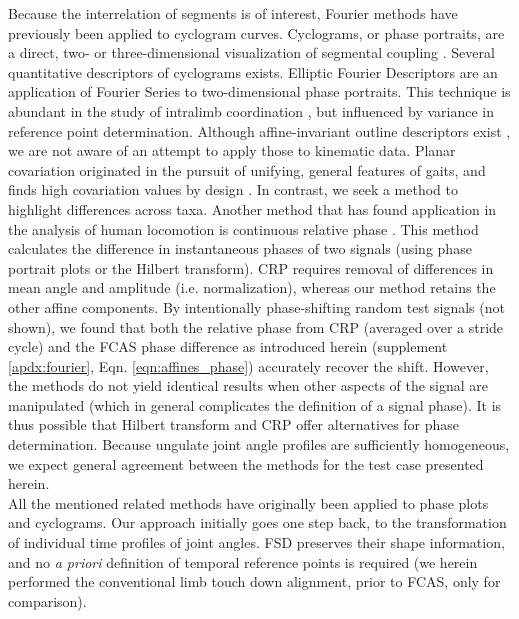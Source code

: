 Because the interrelation of segments is of interest, Fourier methods have previously been applied to cyclogram curves.
Cyclograms, or phase portraits, are a direct, two- or three-dimensional visualization of segmental coupling \citep{Bernstein1934,Goswami1998,DAout2002}.
Several quantitative descriptors of cyclograms exists.
Elliptic Fourier Descriptors \citep{Kuhl1982,Wheat2006} are an application of Fourier Series to two-dimensional phase portraits.
This technique is abundant in the study of intralimb coordination \citep[e.g.][]{Polk2008,HsiaoWecksler2010,Rosengren2009}, but influenced by variance in reference point determination.
Although affine-invariant outline descriptors exist \citep[e.g.][]{Arbter1990}, we are not aware of an attempt to apply those to kinematic data.
Planar covariation \citep{Borghese1996,Hallemans2009,Ogihara2014} originated in the pursuit of unifying, general features of gaits, and finds high covariation values by design \citep[choice of segment angles, common temporal swing/stance structure for these, use of PCA;][]{Hicheur2006,Ivanenko2008}.
In contrast, we seek a method to highlight differences across taxa.
Another method that has found application in the analysis of human locomotion is continuous relative phase \citep[CRP, \textit{cf.}][]{Lamb2014}.
This method calculates the difference in instantaneous phases of two signals (using phase portrait plots or the Hilbert transform).
CRP requires removal of differences in mean  angle and amplitude (i.e. normalization), whereas our method retains the other affine components.
By intentionally phase-shifting random test signals (not shown), we found that both the relative phase from CRP (averaged over a stride cycle) and the FCAS phase difference as introduced herein (supplement \ref*{apdx:fourier}, Eqn. \ref*{eqn:affines_phase}) accurately recover the shift.
However, the methods do not yield identical results when other aspects of the signal are manipulated (which in general complicates the definition of a signal phase).
It is thus possible that Hilbert transform and CRP offer alternatives for phase determination.
Because ungulate joint angle profiles are sufficiently homogeneous, we expect general agreement between the methods for the test case presented herein.
\\All the mentioned related methods have originally been applied to phase plots and cyclograms.
Our approach initially goes one step back, to the transformation of individual time profiles of joint angles.
FSD preserves their shape information, and no \textit{a priori} definition of temporal reference points is required (we herein performed the conventional limb touch down alignment, prior to FCAS, only for comparison).
